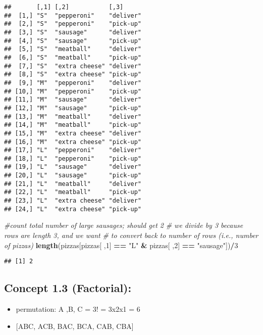 \documentclass[
]{article}
\newenvironment{Shaded}{\begin{snugshade}}{\end{snugshade}}
\newcommand{\CommentTok}[1]{\textcolor[rgb]{0.56,0.35,0.01}{\textit{#1}}}
\newcommand{\DecValTok}[1]{\textcolor[rgb]{0.00,0.00,0.81}{#1}}
\newcommand{\FunctionTok}[1]{\textcolor[rgb]{0.13,0.29,0.53}{\textbf{#1}}}
\newcommand{\NormalTok}[1]{#1}
\newcommand{\SpecialCharTok}[1]{\textcolor[rgb]{0.81,0.36,0.00}{\textbf{#1}}}
\newcommand{\StringTok}[1]{\textcolor[rgb]{0.31,0.60,0.02}{#1}}
\providecommand{\tightlist}{%
  \setlength{\itemsep}{0pt}\setlength{\parskip}{0pt}}
\begin{document}
\begin{verbatim}
##       [,1] [,2]           [,3]     
##  [1,] "S"  "pepperoni"    "deliver"
##  [2,] "S"  "pepperoni"    "pick-up"
##  [3,] "S"  "sausage"      "deliver"
##  [4,] "S"  "sausage"      "pick-up"
##  [5,] "S"  "meatball"     "deliver"
##  [6,] "S"  "meatball"     "pick-up"
##  [7,] "S"  "extra cheese" "deliver"
##  [8,] "S"  "extra cheese" "pick-up"
##  [9,] "M"  "pepperoni"    "deliver"
## [10,] "M"  "pepperoni"    "pick-up"
## [11,] "M"  "sausage"      "deliver"
## [12,] "M"  "sausage"      "pick-up"
## [13,] "M"  "meatball"     "deliver"
## [14,] "M"  "meatball"     "pick-up"
## [15,] "M"  "extra cheese" "deliver"
## [16,] "M"  "extra cheese" "pick-up"
## [17,] "L"  "pepperoni"    "deliver"
## [18,] "L"  "pepperoni"    "pick-up"
## [19,] "L"  "sausage"      "deliver"
## [20,] "L"  "sausage"      "pick-up"
## [21,] "L"  "meatball"     "deliver"
## [22,] "L"  "meatball"     "pick-up"
## [23,] "L"  "extra cheese" "deliver"
## [24,] "L"  "extra cheese" "pick-up"
\end{verbatim}

\begin{Shaded}
\begin{Highlighting}[]
\CommentTok{\#count total number of large sausages; should get 2}
\CommentTok{\#   we divide by 3 because rows are length 3, and we want}
\CommentTok{\#   to convert back to number of rows (i.e., number of pizzas)}
\FunctionTok{length}\NormalTok{(pizzas[pizzas[ ,}\DecValTok{1}\NormalTok{] }\SpecialCharTok{==} \StringTok{"L"} \SpecialCharTok{\&}\NormalTok{ pizzas[ ,}\DecValTok{2}\NormalTok{] }\SpecialCharTok{==} \StringTok{"sausage"}\NormalTok{])}\SpecialCharTok{/}\DecValTok{3}
\end{Highlighting}
\end{Shaded}

\begin{verbatim}
## [1] 2
\end{verbatim}

\hypertarget{concept-1.3-factorial}{%
\subsection{Concept 1.3 (Factorial):}\label{concept-1.3-factorial}}

\begin{itemize}
\tightlist
\item
  permutation: A ,B, C = 3! = 3x2x1 = 6
\item
  {[}ABC, ACB, BAC, BCA, CAB, CBA{]}
\end{itemize}
\end{document}
